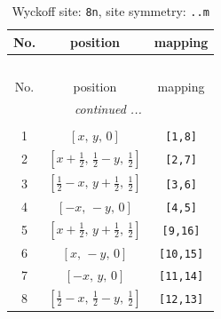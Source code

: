 \documentclass[fleqn,8pt]{jsarticle}
\begin{document}
\begin{longtable}{ccc}
\caption{Wyckoff site: {\tt 8n}, site symmetry: {\tt ..m}}
 \\
 \hline \hline
No. & position & mapping \\ \hline \endfirsthead

\multicolumn{2}{l}{\tablename\ \thetable{}} \\
 \hline \hline
No. & position & mapping \\ \hline \endhead

 \hline \hline
\multicolumn{2}{r}{\footnotesize\it continued ...} \\ \endfoot

 \hline \hline
\multicolumn{2}{r}{} \\ \endlastfoot

1 & $\left[ x,\, y,\, 0 \right]$ & {\tt [1,8]} \\ \hline
2 & $\left[ x + \frac{1}{2},\, \frac{1}{2} - y,\, \frac{1}{2} \right]$ & {\tt [2,7]} \\ \hline
3 & $\left[ \frac{1}{2} - x,\, y + \frac{1}{2},\, \frac{1}{2} \right]$ & {\tt [3,6]} \\ \hline
4 & $\left[ - x,\, - y,\, 0 \right]$ & {\tt [4,5]} \\ \hline
5 & $\left[ x + \frac{1}{2},\, y + \frac{1}{2},\, \frac{1}{2} \right]$ & {\tt [9,16]} \\ \hline
6 & $\left[ x,\, - y,\, 0 \right]$ & {\tt [10,15]} \\ \hline
7 & $\left[ - x,\, y,\, 0 \right]$ & {\tt [11,14]} \\ \hline
8 & $\left[ \frac{1}{2} - x,\, \frac{1}{2} - y,\, \frac{1}{2} \right]$ & {\tt [12,13]} \\
\end{longtable}
\renewcommand{\arraystretch}{1.2}
\end{document}
